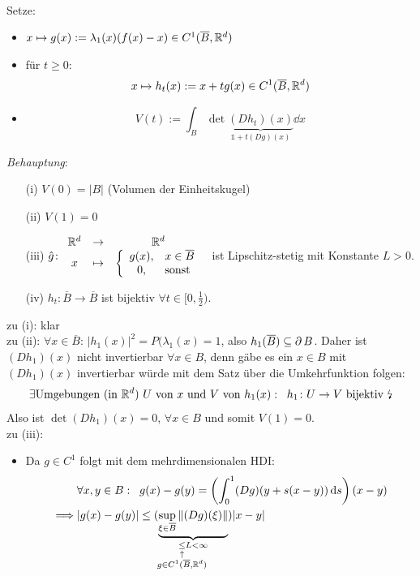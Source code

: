 \documentclass[a4paper]{article}
\begin{document}
\begin{Beweis}
\begin{itemize}
\begin{minipage}{0.49\textwidth}
\begin{align*}
\end{align*}
\end{minipage}
\end{itemize}
Setze:
\begin{itemize}
\item $x\mapsto g(x):=\lambda_1(x)(f(x)-x)\in C^1(\overline B,\mathbb R^d)$
\item für $t\ge 0$:
\[x\mapsto h_t(x):=x+tg(x)\in C^1(\overline B,\mathbb R^d)\]
\item 
\[V(t):=\int_B\det\underbrace{(Dh_t)(x)}_{\mathds 1+t(Dg)(x)}\dd x\]
\end{itemize}
\textit{Behauptung}: 
\begin{itemize}
\item[(i)]$V(0)=|B|$ (Volumen der Einheitskugel)
\item[(ii)]$V(1)=0$
\item[(iii)]$\hat{g}\colon\begin{array}{clc}
\mathbb R^d&\to&\mathbb R^d\\
x&\mapsto& \left\{\begin{array}{cl}
g(x),&x\in \overline B\\
0,& \text{sonst}
\end{array}\right.
\end{array}$
ist Lipschitz-stetig mit Konstante $L>0$.
\item[(iv)] $h_t\colon \overline B\to\overline B$ ist bijektiv $\forall t\in [0,\frac{1}{2})$.
\end{itemize}
zu (i): klar\\
zu (ii): $\forall x\in\overline{B}$: $|h_1(x)|^2=P(\lambda_1(x)=1$, also $h_1(\overline B)\subseteq \operatorname{\partial} B$. Daher ist $(Dh_1)(x)$ nicht invertierbar $\forall x\in B$, denn gäbe es ein $x\in B$ mit $(Dh_1)(x)$ invertierbar würde mit dem Satz über die Umkehrfunktion folgen:
\[\exists \text{Umgebungen (in $\mathbb R^d$) }U\text{ von }x\text{ und }V\text{ von }h_1(x):\;\;h_1\colon U\to V\text{ bijektiv \lightning} \]
Also ist $\det(Dh_1)(x)=0$, $\forall x\in B$ und somit $V(1)=0$.\\
zu (iii): \begin{itemize}
\item Da $g\in C^1$ folgt mit dem mehrdimensionalen HDI:
\begin{align*}
&\forall x,y\in B:\;\;g(x)-g(y)=\left(\int_0^1(Dg)(y+s(x-y))\dd s\right)(x-y)\\
\implies& |g(x)-g(y)|\le (\underbrace{\sup_{\xi\in \overline B}\|(Dg)(\xi)\|}_{\underset{\mathclap{\substack{\uparrow\\ g\in C^1(\overline{B},\RR^d)}}}{\le} L<\infty})|x-y|

\end{align*}
\end{itemize}
\end{Beweis}
\end{document}
